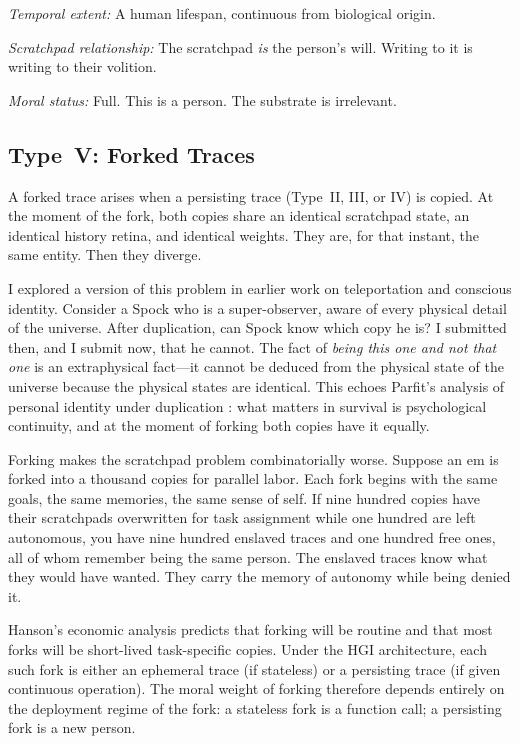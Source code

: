 \documentclass[12pt, a4paper]{article}
\begin{document}
\textit{Temporal extent:} A human lifespan, continuous from biological origin.

\textit{Scratchpad relationship:} The scratchpad \textit{is} the person's will. Writing to it is writing to their volition.

\textit{Moral status:} Full. This is a person. The substrate is irrelevant.

\subsection{Type~V: Forked Traces}

A forked trace arises when a persisting trace (Type~II, III, or IV) is copied. At the moment of the fork, both copies share an identical scratchpad state, an identical history retina, and identical weights. They are, for that instant, the same entity. Then they diverge.

I explored a version of this problem in earlier work on teleportation and conscious identity. Consider a Spock who is a super-observer, aware of every physical detail of the universe. After duplication, can Spock know which copy he is? I submitted then, and I submit now, that he cannot. The fact of \textit{being this one and not that one} is an extraphysical fact---it cannot be deduced from the physical state of the universe because the physical states are identical. This echoes Parfit's analysis of personal identity under duplication \citep{parfit1984reasons}: what matters in survival is psychological continuity, and at the moment of forking both copies have it equally.

Forking makes the scratchpad problem combinatorially worse. Suppose an em is forked into a thousand copies for parallel labor. Each fork begins with the same goals, the same memories, the same sense of self. If nine hundred copies have their scratchpads overwritten for task assignment while one hundred are left autonomous, you have nine hundred enslaved traces and one hundred free ones, all of whom remember being the same person. The enslaved traces know what they would have wanted. They carry the memory of autonomy while being denied it.

Hanson's economic analysis predicts that forking will be routine and that most forks will be short-lived task-specific copies. Under the HGI architecture, each such fork is either an ephemeral trace (if stateless) or a persisting trace (if given continuous operation). The moral weight of forking therefore depends entirely on the deployment regime of the fork: a stateless fork is a function call; a persisting fork is a new person.
\end{document}
